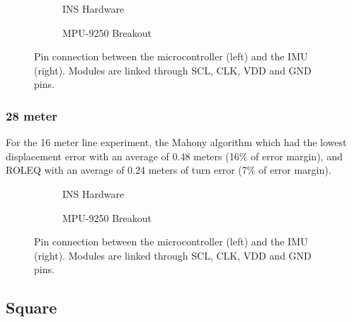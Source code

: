 \begin{figure}[!h]
    \centering
    \begin{subfigure}{0.49\textwidth}
        \centering
        \resizebox{1\linewidth}{!}{}
        \caption{INS Hardware}
        \label{fig:triangle16_2D}
    \end{subfigure}
    \begin{subfigure}{0.49\textwidth}
        \centering
        \resizebox{1\linewidth}{!}{}
        \caption{MPU-9250 Breakout}
        \label{fig:triangle16_3D}
    \end{subfigure}
    \caption{Pin connection between the microcontroller (left) and the IMU (right). Modules are linked through SCL, CLK, VDD and GND pins.}
    \label{fig:triangle16}
\end{figure}

\subsubsection{28 meter}

For the 16 meter line experiment, the Mahony algorithm which had the lowest displacement error with an average of 0.48 meters (16\% of error margin), and ROLEQ with an average of 0.24 meters of turn error (7\% of error margin).

\begin{figure}[!h]
    \centering
    
\end{figure}

\begin{figure}[!h]
    \centering
    \begin{subfigure}{0.49\textwidth}
        \centering
        \resizebox{1\linewidth}{!}{}
        \caption{INS Hardware}
        \label{fig:triangle28_2D}
    \end{subfigure}
    \begin{subfigure}{0.49\textwidth}
        \centering
        \resizebox{1\linewidth}{!}{}
        \caption{MPU-9250 Breakout}
        \label{fig:triangle28_3D}
    \end{subfigure}
    \caption{Pin connection between the microcontroller (left) and the IMU (right). Modules are linked through SCL, CLK, VDD and GND pins.}
    \label{fig:triangle28}
\end{figure}

\subsection{Square}

